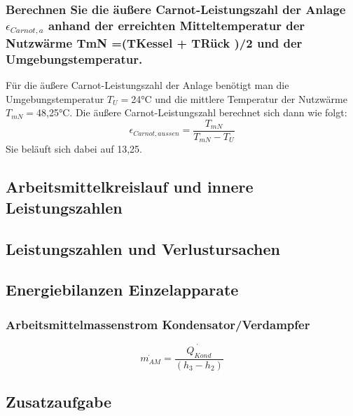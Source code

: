 \subsubsection{Berechnen Sie die äußere Carnot-Leistungszahl der Anlage $\epsilon_{Carnot,a}$ anhand der erreichten Mitteltemperatur der Nutzwärme TmN =(TKessel + TRück )/2 und der Umgebungstemperatur.}
Für die äußere Carnot-Leistungszahl der Anlage benötigt man die Umgebungstemperatur $T_{U}=$24°C und die mittlere Temperatur der Nutzwärme $T_{mN}=$48,25°C. Die äußere Carnot-Leistungszahl berechnet sich dann wie folgt: 
\begin{equation}
\epsilon_{Carnot,aussen} = \frac{T_{mN}}{T_{mN}-T_{U}}
\label{eq:110623_aeußere Carnot Leistungszahl}
\end{equation}
Sie beläuft sich dabei auf 13,25.

\subsection{Arbeitsmittelkreislauf und innere Leistungszahlen}

\subsection{Leistungszahlen und Verlustursachen}

\subsection{Energiebilanzen Einzelapparate}
\subsubsection*{Arbeitsmittelmassenstrom Kondensator/Verdampfer}
\begin{equation}
   \dot{m_{AM}} = \frac{\dot{Q_{Kond}}}{(h_3 - h_2)}
\end{equation}
\subsection{Zusatzaufgabe}
